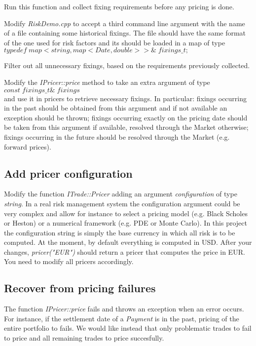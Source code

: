 \documentclass[10pt]{article}
\begin{document}
Run this function and collect fixing requirements before any pricing is done.

Modify \textit{RiskDemo.cpp} to accept a third command line argument with the name of a file containing some historical fixings. The file should have the same format of the one used for risk factors and its should be loaded in a map of type\\
$typedef\; map<string,map<Date,double>>\&\; fixings\_t;$

Filter out all unnecessary fixings, based on the requirements previously collected.

Modify the \textit{IPricer::price} method to take an extra argument of type\\ $const\; fixings\_t\&\; fixings$\\ and use it in pricers to retrieve necessary fixings. In particular: fixings occurring in the past should be obtained from this argument and if not available an exception should be thrown; fixings occurring exactly on the pricing date should be taken from this argument if available, resolved through the Market otherwise; fixings occurring in the future should be resolved through the Market (e.g. forward prices).

\subsection{Add pricer configuration}
Modify the function \textit{ITrade::Pricer} adding an argument \textit{configuration} of type \textit{string}. In a real risk management system the configuration argument could be very complex and allow for instance to select a pricing model (e.g. Black Scholes or Heston) or a numerical framework (e.g. PDE or Monte Carlo). In this project the configuration string is simply the base currency in which all risk is to be computed. At the moment, by default everything is computed in USD. After your changes, \textit{pricer("EUR")} should return a pricer that computes the price in EUR.\\

You need to modify all pricers accordingly.

\subsection{Recover from pricing failures}
The function \textit{IPricer::price} fails and throws an exception when an error occurs. For instance, if the settlement date of a \textit{Payment} is in the past, pricing of the entire portfolio to fails. We would like instead that only problematic trades to fail to price and all remaining trades to price succesfully.
\end{document}
